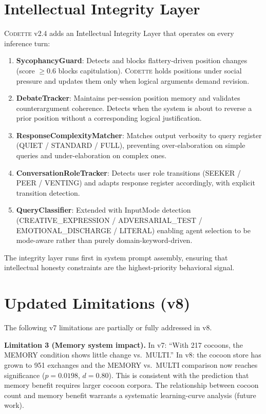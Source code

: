 \documentclass[11pt,a4paper]{article}
\newcommand{\codette}{\textsc{Codette}}
\begin{document}
\section{Intellectual Integrity Layer}
\label{sec:integrity}

\codette{} v2.4 adds an Intellectual Integrity Layer that operates on every
inference turn:

\begin{enumerate}[nosep]
  \item \textbf{SycophancyGuard}: Detects and blocks flattery-driven position
    changes (score $\geq 0.6$ blocks capitulation). \codette{} holds positions
    under social pressure and updates them only when logical arguments demand
    revision.
  \item \textbf{DebateTracker}: Maintains per-session position memory and
    validates counterargument coherence. Detects when the system is about to
    reverse a prior position without a corresponding logical justification.
  \item \textbf{ResponseComplexityMatcher}: Matches output verbosity to query
    register (QUIET / STANDARD / FULL), preventing over-elaboration on simple
    queries and under-elaboration on complex ones.
  \item \textbf{ConversationRoleTracker}: Detects user role transitions
    (SEEKER / PEER / VENTING) and adapts response register accordingly, with
    explicit transition detection.
  \item \textbf{QueryClassifier}: Extended with InputMode detection
    (CREATIVE\_EXPRESSION / ADVERSARIAL\_TEST / EMOTIONAL\_DISCHARGE / LITERAL)
    enabling agent selection to be mode-aware rather than purely
    domain-keyword-driven.
\end{enumerate}

The integrity layer runs first in system prompt assembly, ensuring that
intellectual honesty constraints are the highest-priority behavioral signal.

\section{Updated Limitations (v8)}
\label{sec:limitations-v8}

The following v7 limitations are partially or fully addressed in v8.

\textbf{Limitation 3 (Memory system impact).} In v7: ``With 217 cocoons, the
MEMORY condition shows little change vs.\ MULTI.'' In v8: the cocoon store has
grown to 951 exchanges and the MEMORY vs.\ MULTI comparison now reaches
significance ($p=0.0198$, $d=0.80$). This is consistent with the prediction
that memory benefit requires larger cocoon corpora. The relationship between
cocoon count and memory benefit warrants a systematic learning-curve analysis
(future work).
\end{document}
